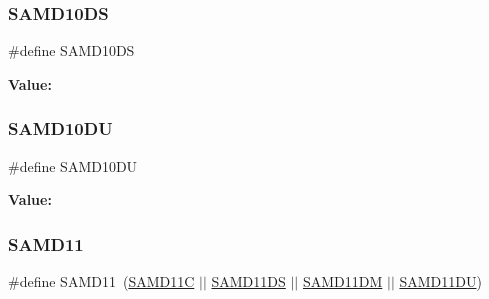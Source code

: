 \subsubsection{\texorpdfstring{SAMD10DS}{SAMD10DS}}
{\footnotesize\ttfamily \#define S\+A\+M\+D10\+DS}

{\bfseries Value\+:}
\begin{DoxyCode}{0}
\DoxyCodeLine{( \(\backslash\)}
\DoxyCodeLine{    )}

\end{DoxyCode}
\mbox{\label{group__sam__part__macros__group_ga697aef1095ce9ad2da295844d802cd1a}} 
\subsubsection{\texorpdfstring{SAMD10DU}{SAMD10DU}}
{\footnotesize\ttfamily \#define S\+A\+M\+D10\+DU}

{\bfseries Value\+:}
\begin{DoxyCode}{0}
\DoxyCodeLine{( \(\backslash\)}
\DoxyCodeLine{    )}

\end{DoxyCode}
\mbox{\label{group__sam__part__macros__group_ga9e5edb5637174377186d92141e7f60d9}} 
\subsubsection{\texorpdfstring{SAMD11}{SAMD11}}
{\footnotesize\ttfamily \#define S\+A\+M\+D11~(\mbox{\hyperlink{group__sam__part__macros__group_ga04267f2c27b0e5c265d7cf75e41728b5}{S\+A\+M\+D11C}} $\vert$$\vert$ \mbox{\hyperlink{group__sam__part__macros__group_ga5a5c9017efa9764ece7e1e7fee1f5866}{S\+A\+M\+D11\+DS}} $\vert$$\vert$ \mbox{\hyperlink{group__sam__part__macros__group_gaa3d39f43fd1dfb13a8e3769dadd3a3b2}{S\+A\+M\+D11\+DM}} $\vert$$\vert$ \mbox{\hyperlink{group__sam__part__macros__group_gaf49d4f8c4df8247e3b09f8c5369589a5}{S\+A\+M\+D11\+DU}})}

